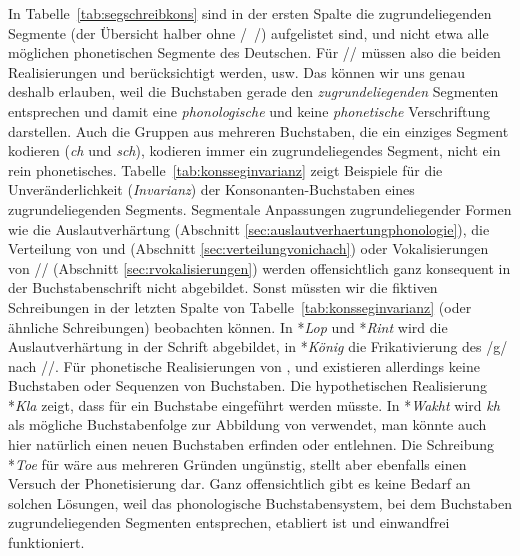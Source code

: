 In Tabelle~\ref{tab:segschreibkons} sind in der ersten Spalte die zugrundeliegenden Segmente (der Übersicht halber ohne /~/) aufgelistet sind, und nicht etwa alle möglichen phonetischen Segmente des Deutschen.
Für // müssen also die beiden Realisierungen \textipa{[\c{c}]} und \textipa{[X]} berücksichtigt werden, usw.
Das können wir uns genau deshalb erlauben, weil die Buchstaben gerade den \textit{zugrundeliegenden} Segmenten entsprechen und damit eine \textit{phonologische} und keine \textit{phonetische} Verschriftung darstellen.
Auch die Gruppen aus mehreren Buchstaben, die ein einziges Segment kodieren (\zB \textit{ch} und \textit{sch}), kodieren immer ein zugrundeliegendes Segment, nicht ein rein phonetisches. 
Tabelle~\ref{tab:konsseginvarianz} zeigt Beispiele für die Unveränderlichkeit (\textit{Invarianz}) der Konsonanten-Buchstaben eines zugrundeliegenden Segments.
Segmentale Anpassungen zugrundeliegender Formen wie die Auslautverhärtung (Abschnitt \ref{sec:auslautverhaertungphonologie}), die Verteilung von \textipa{[\c{c}]} und \textipa{[X]} (Abschnitt \ref{sec:verteilungvonichach}) oder Vokalisierungen von // (Abschnitt \ref{sec:rvokalisierungen}) werden offensichtlich ganz konsequent in der Buchstabenschrift nicht abgebildet.
Sonst müssten wir die fiktiven Schreibungen in der letzten Spalte von Tabelle~\ref{tab:konsseginvarianz} (oder ähnliche Schreibungen) beobachten können.
In *\textit{Lop} und *\textit{Rint} wird die Auslautverhärtung in der Schrift abgebildet, in *\textit{König} die Frikativierung des /g/ nach //. 
Für phonetische Realisierungen von \textipa{[N]}, \textipa{[X]} und \textipa{[5]} existieren allerdings keine Buchstaben oder Sequenzen von Buchstaben.
Die hypothetischen Realisierung *\textit{Kla} zeigt, dass für \textipa{[N]} ein Buchstabe eingeführt werden müsste.
In *\textit{Wakht} wird \textit{kh} als mögliche Buchstabenfolge zur Abbildung von \textipa{[X]} verwendet, man könnte auch hier natürlich einen neuen Buchstaben erfinden oder entlehnen.
Die Schreibung *\textit{Toe} für \textipa{[t\t{o5}]} wäre aus mehreren Gründen ungünstig, stellt aber ebenfalls einen Versuch der Phonetisierung dar.
Ganz offensichtlich gibt es keine Bedarf an solchen Lösungen, weil das phonologische Buchstabensystem, bei dem Buchstaben zugrundeliegenden Segmenten entsprechen, etabliert ist und einwandfrei funktioniert.

